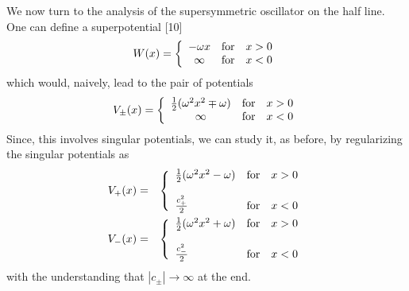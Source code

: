 \documentclass[a4paper,11pt]{article}
\begin{document}
We now turn to the analysis of the supersymmetric oscillator on
the half line. One can define a superpotential [10]
\begin{equation}
W(x) = \left\{\begin{array}{cll}
              -\omega x & {\rm for} & x>0\\
              \infty & {\rm for} & x<0
              \end{array}\right.\label{b9'}
\end{equation}
which would, naively, lead to the pair of potentials
\begin{equation}
V_{\pm}(x) = \left\{\begin{array}{cll}
                    {1\over 2}(\omega^{2} x^{2} \mp \omega) & {\rm
                    for} & x>0\\
                    \infty & {\rm for} & x<0
                    \end{array}\right.
\end{equation}
Since, this involves  singular potentials, we can study it, as before,
by  regularizing the singular potentials as 
\begin{eqnarray}
V_{+}(x) & = &  \left\{\begin{array}{lll}
               {1\over 2}(\omega^{2}x^{2}-\omega)& {\rm for}& x>0\\
                  &   &\\
               {c_{+}^{2}\over 2} & {\rm for} & x<0
              \end{array}\right.\nonumber\\
V_{-}(x) & = &  \left\{\begin{array}{lll}
               {1\over 2}(\omega^{2}x^{2}+\omega)& {\rm for}& x>0\\
                  &   &\\
               {c_{-}^{2}\over 2} & {\rm for} & x<0
              \end{array}\right.\label{b10}
\end{eqnarray}
with the understanding that $|c_{\pm}|\rightarrow\infty$ at the end.
\end{document}
